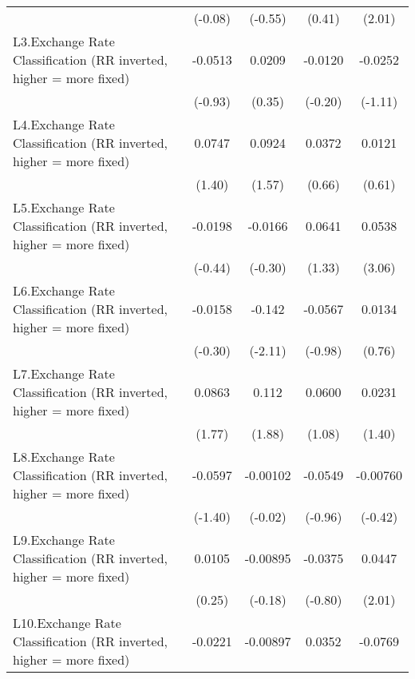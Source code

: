 {\begin{longtable}{l*{4}{c}}
                &  (-0.08)         &  (-0.55)         &   (0.41)         &   (2.01)         \\
[1em]
L3.Exchange Rate Classification (RR inverted, higher = more fixed)&  -0.0513         &   0.0209         &  -0.0120         &  -0.0252         \\
                &  (-0.93)         &   (0.35)         &  (-0.20)         &  (-1.11)         \\
[1em]
L4.Exchange Rate Classification (RR inverted, higher = more fixed)&   0.0747         &   0.0924         &   0.0372         &   0.0121         \\
                &   (1.40)         &   (1.57)         &   (0.66)         &   (0.61)         \\
[1em]
L5.Exchange Rate Classification (RR inverted, higher = more fixed)&  -0.0198         &  -0.0166         &   0.0641         &   0.0538\sym{**} \\
                &  (-0.44)         &  (-0.30)         &   (1.33)         &   (3.06)         \\
[1em]
L6.Exchange Rate Classification (RR inverted, higher = more fixed)&  -0.0158         &   -0.142\sym{*}  &  -0.0567         &   0.0134         \\
                &  (-0.30)         &  (-2.11)         &  (-0.98)         &   (0.76)         \\
[1em]
L7.Exchange Rate Classification (RR inverted, higher = more fixed)&   0.0863         &    0.112         &   0.0600         &   0.0231         \\
                &   (1.77)         &   (1.88)         &   (1.08)         &   (1.40)         \\
[1em]
L8.Exchange Rate Classification (RR inverted, higher = more fixed)&  -0.0597         & -0.00102         &  -0.0549         & -0.00760         \\
                &  (-1.40)         &  (-0.02)         &  (-0.96)         &  (-0.42)         \\
[1em]
L9.Exchange Rate Classification (RR inverted, higher = more fixed)&   0.0105         & -0.00895         &  -0.0375         &   0.0447\sym{*}  \\
                &   (0.25)         &  (-0.18)         &  (-0.80)         &   (2.01)         \\
[1em]
L10.Exchange Rate Classification (RR inverted, higher = more fixed)&  -0.0221         & -0.00897         &   0.0352         &  -0.0769\sym{**} \\

\end{longtable}}
